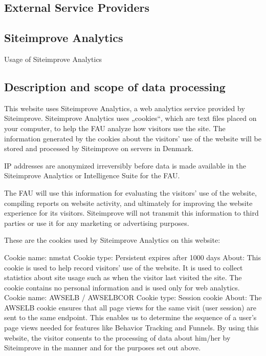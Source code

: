 \documentclass[letterpaper,10pt,english]{sphinxmanual}
\begin{document}
\subsection{External Service Providers}
\label{\detokenize{policies/privacy:external-service-providers}}

\subsection{Siteimprove Analytics}
\label{\detokenize{policies/privacy:siteimprove-analytics}}
\sphinxAtStartPar
Usage of Siteimprove Analytics


\subsection{Description and scope of data processing}
\label{\detokenize{policies/privacy:id8}}
\sphinxAtStartPar
This website uses Siteimprove Analytics, a web analytics service provided by Siteimprove. Siteimprove Analytics uses „cookies“, which are text files placed on your computer, to help the FAU analyze how visitors use the site. The information generated by the cookies about the visitors’ use of the website will be stored and processed by Siteimprove on servers in Denmark.

\sphinxAtStartPar
IP addresses are anonymized irreversibly before data is made available in the Siteimprove Analytics or Intelligence Suite for the FAU.

\sphinxAtStartPar
The FAU will use this information for evaluating the visitors’ use of the website, compiling reports on website activity, and ultimately for improving the website experience for its visitors. Siteimprove will not transmit this information to third parties or use it for any marketing or advertising purposes.

\sphinxAtStartPar
These are the cookies used by Siteimprove Analytics on this website:

\sphinxAtStartPar
Cookie name: nmstat
Cookie type: Persistent \sphinxhyphen{} expires after 1000 days
About: This cookie is used to help record visitors’ use of the website. It is used to collect statistics about site usage such as when the visitor last visited the site. The cookie contains no personal information and is used only for web analytics.
Cookie name: AWSELB / AWSELBCOR
Cookie type: Session cookie
About: The AWSELB cookie ensures that all page views for the same visit (user session) are sent to the same endpoint. This enables us to determine the sequence of a user’s page views needed for features like Behavior Tracking and Funnels.
By using this website, the visitor consents to the processing of data about him/her by Siteimprove in the manner and for the purposes set out above.
\end{document}
